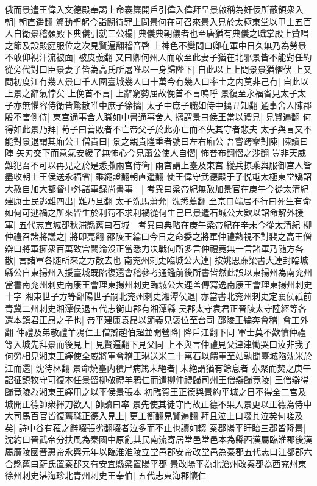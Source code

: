 俄而景遣王偉入文德殿奉謁上命褰簾開戶引偉入偉拜呈景啟稱為奸佞所蔽領衆入朝|{
	朝直遥翻}
驚動聖躬今詣闕待罪上問景何在可召來景入見於太極東堂以甲士五百人自衛景稽顙殿下典儀引就三公榻|{
	典儀典朝儀者也至唐猶有典儀之職掌殿上贊唱之節及設殿庭服位之次見賢遍翻稽音啓}
上神色不變問曰卿在軍中日久無乃為勞景不敢仰視汗流被面|{
	被皮義翻}
又曰卿何州人而敢至此妻子猶在北邪景皆不能對任約從旁代對曰臣景妻子皆為高氏所屠唯以一身歸陛下|{
	自此以上上問景景猶慴伏}
上又問初度江有幾人景曰千人圍臺城幾人曰十萬今有幾人曰率土之内莫非己有|{
	自此以上景之辭氣悖矣}
上俛首不言|{
	上辭窮勢屈故俛首不言嗚呼}
景復至永福省見太子太子亦無懼容侍衛皆驚散唯中庶子徐摛|{
	太子中庶子職如侍中摛丑知翻}
通事舍人陳郡殷不害側侍|{
	東宫通事舍人職如中書通事舍人}
摛謂景曰侯王當以禮見|{
	見賢遍翻}
何得如此景乃拜|{
	荀子曰善敗者不亡帝父子於此亦亡而不失其守者悲夫}
太子與言又不能對景退謂其廂公王僧貴曰|{
	景之親貴隆重者號曰左右廂公}
吾嘗跨鞌對陳|{
	陳讀曰陣}
矢刃交下而意氣安緩了無怖心今見蕭公使人自慴|{
	怖普布翻慴之涉翻}
豈非天威難犯吾不可以再見之於是悉撒兩宫侍衛|{
	兩宫謂上臺及東宫}
縱兵掠乘輿服御宫人皆盡收朝士王侯送永福省|{
	乘繩證翻朝直遥翻}
使王偉守武德殿于子悦屯太極東堂矯詔大赦自加大都督中外諸軍録尚書事　|{
	考異曰梁帝紀無赦加景官在庚午今從太清紀}
建康士民逃難四出|{
	難乃旦翻}
太子洗馬蕭允|{
	洗悉薦翻}
至京口端居不行曰死生有命如何可逃禍之所來皆生於利苟不求利禍從何生己巳景遣石城公大欵以詔命解外援軍|{
	五代志宣城郡秋浦縣舊曰石城　考異曰典略在庚午梁帝紀在辛未今從太清紀}
柳仲禮召諸將議之|{
	將即亮翻}
邵陵王綸曰今日之命委之將軍仲禮熟視不對裴之高王僧辯曰將軍擁衆百萬致宫闕淪沒正當悉力决戰何所多言仲禮竟無一言諸軍乃随方各散|{
	言諸軍各随所來之方散去也}
南兖州刺史臨城公大連|{
	按姚思亷梁書大連封臨城縣公自東揚州入援臺城既陷復還會稽參考通鑑前後所書皆然此誤以東揚州為南兖州當書南兖州刺史南康王會理東揚州刺史臨城公大連盖傳寫逸南康王會理東揚州刺史十字}
湘東世子方等鄱陽世子嗣北兖州刺史湘潭侯退|{
	亦當書北兖州刺史定襄侯祇前青冀二州刺史湘潭侯退五代志衡山郡有湘潭縣}
吴郡太守袁君正晉陵太守陸經等各還本鎮君正昂之子也|{
	帝平建康袁昂以節義見褒位至台司}
邵陵王綸奔會稽|{
	會工外翻}
仲禮及弟敬禮羊鴉仁王僧辯趙伯超並開營降|{
	降戶江翻下同}
軍士莫不歎憤仲禮等入城先拜景而後見上|{
	見賢遍翻下見父同}
上不與言仲禮見父津津慟哭曰汝非我子何勞相見湘東王繹使全威將軍會稽王琳送米二十萬石以饋軍至姑孰聞臺城陷沈米於江而還|{
	沈待林翻}
景命燒臺内積尸病篤未絶者|{
	未絶謂猶有餘息者}
亦聚而焚之庚午詔征鎮牧守可復本任景留柳敬禮羊鴉仁而遣柳仲禮歸司州王僧辯歸竟陵|{
	王僧辯得歸竟陵為湘東王繹用之以平侯景張本}
初臨賀王正德與景約平城之日不得全二宫及城開正德帥衆揮刀欲入|{
	帥讀曰率}
景先使其徒守門故正德不果入景更以正德為侍中大司馬百官皆復舊職正德入見上|{
	更工衡翻見賢遍翻}
拜且泣上曰啜其泣矣何嗟及矣|{
	詩中谷有蓷之辭啜張劣翻啜者泣多而不止也讀如輟}
秦郡陽平盱眙三郡皆降景|{
	沈約曰晉武帝分扶風為秦國中原亂其民南流寄居堂邑堂邑本為縣西漢屬臨淮郡後漢屬廣陵國晉惠帝永興元年以臨淮淮陵立堂邑郡安帝改堂邑為秦郡五代志曰江都郡六合縣舊曰蔚氏置秦郡又有安宜縣梁置陽平郡}
景改陽平為北滄州改秦郡為西兖州東徐州刺史湛海珍北青州刺史王奉伯|{
	五代志東海郡懷仁}


